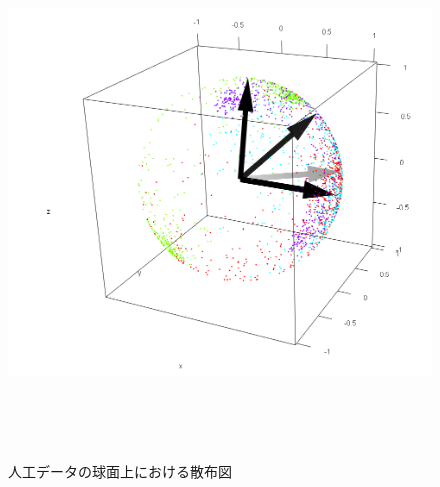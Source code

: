 \documentclass[a4j,12pt]{jarticle}
\begin{document}
\newpage %
\begin{figure}[tbp]
\begin{center}
\includegraphics[clip,height= 140mm]{data/cluster_3d_sim_real.png}
\end{center}
\caption{人工データの球面上における散布図}
\label{clusterplot3d_real}
\end{figure}
\end{document}
